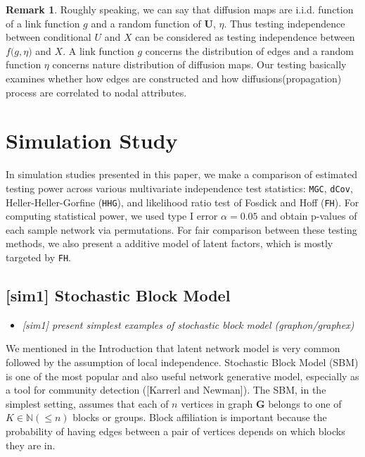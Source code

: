 \documentclass[12pt]{article}
\theoremstyle{definition}
\newtheorem{remark}{Remark}
\begin{document}
\begin{remark}
Roughly speaking, we can say that diffusion maps are i.i.d. function of a link function $g$ and a random function of $\mathbf{U}$, $\eta$. Thus testing independence between conditional $U$ and $X$ can be considered as testing independence between $f \big( g, \eta \big)$ and $X$. A link function $g$ concerns the distribution of edges and a random function $\eta$ concerns nature distribution of diffusion maps. Our testing basically examines whether how edges are constructed and how diffusions(propagation) process are correlated to nodal attributes.  
\end{remark}

\newpage
\section{Simulation Study}
\label{sec:sim}

In simulation studies presented in this paper, we make a comparison of estimated testing power across various multivariate independence test statistics: \texttt{MGC}, \texttt{dCov}, Heller-Heller-Gorfine (\texttt{HHG})\cite{HHG}, and likelihood ratio test of Fosdick and Hoff (\texttt{FH}). For computing statistical power, we used type I error $\alpha = 0.05$ and obtain p-values of each sample network via permutations. For fair comparison between these testing methods, we also present a additive model of latent factors, which is mostly targeted by \texttt{FH}.   

\subsection{[sim1] Stochastic Block Model}
\begin{itemize}
	\item {\it  [sim1] present simplest examples of stochastic block model (graphon/graphex) \/}
\end{itemize}

 We mentioned in the Introduction that latent network model is very common followed by the assumption of local independence. Stochastic Block Model (SBM) is one of the most popular and also useful network generative model, especially as a tool for community detection ([Karrerl and Newman]). The SBM, in the simplest setting, assumes that each of $n$ vertices in graph $\boldsymbol{G}$ belongs to one of $K \in \mathbb{N} (\leq n)$ blocks or groups. Block affiliation is important because the probability of having edges between a pair of vertices depends on which blocks they are in. 
 
\end{document}
